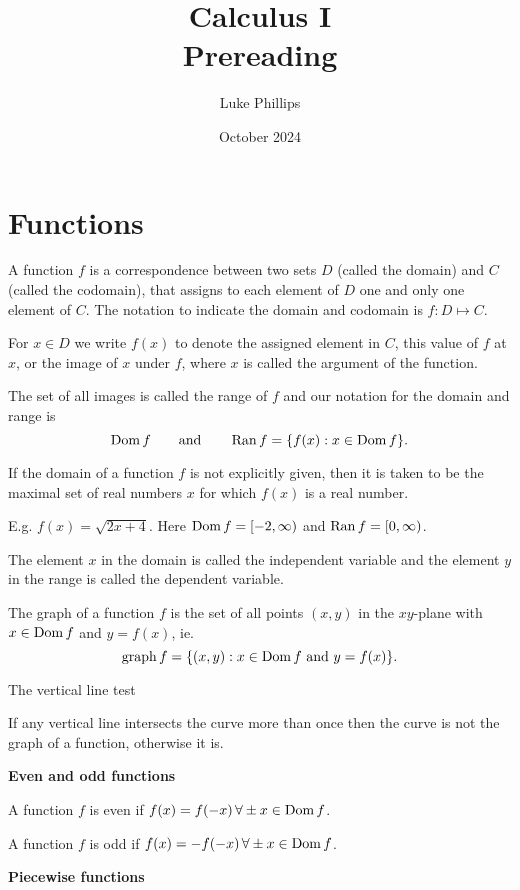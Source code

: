 \documentclass[10pt, a4paper]{article}
\title{Calculus I \\
    \large Prereading}
\author{Luke Phillips}
\date{October 2024}
\begin{document}
\maketitle

\newpage

\tableofcontents

\newpage

\section{Functions}

A function $f$ is a correspondence between two sets $D$ (called the domain) and $C$ (called the codomain), that assigns to each element of $D$ one and only one element of $C$. The notation to indicate the domain and codomain is $f : D \mapsto C$.

For $x \in D$ we write $f(x)$ to denote the assigned element in $C$, this value of $f$ at $x$, or the image of $x$ under $f$, where $x$ is called the argument of the function.

The set of all images is called the range of $f$ and our notation for the domain and range is
\[
\operatorname{Dom} f\qquad\text{and}\qquad\operatorname{Ran} f = \{f(x): x \in \operatorname{Dom} f\}.
\]

If the domain of a function $f$ is not explicitly given, then it is taken to be the maximal set of real numbers $x$ for which $f(x)$ is a real number.

E.g. $f(x) = \sqrt{2x + 4}$. Here $\operatorname{Dom} f = [-2, \infty)$ and $\operatorname{Ran} f = [0, \infty)$.

The element $x$ in the domain is called the independent variable and the element $y$ in the range is called the dependent variable.

The graph of a function $f$ is the set of all points $(x, y)$ in the $xy$-plane with $x \in \operatorname{Dom} f$ and $y = f(x)$, ie.
\[
\mathrm{graph}\, f = \{(x, y) : x \in \operatorname{Dom} f \text{ and } y = f(x)\}.
\]

The vertical line test

If any vertical line intersects the curve more than once then the curve is not the graph of a function, otherwise it is.


\textbf{Even and odd functions}

A function $f$ is even if $f(x) = f(-x)\,\forall\pm x\in\operatorname{Dom} f$.

A function $f$ is odd if $f(x) = -f(-x)\,\forall\pm x\in\operatorname{Dom} f$.

\textbf{Piecewise functions}
\end{document}
